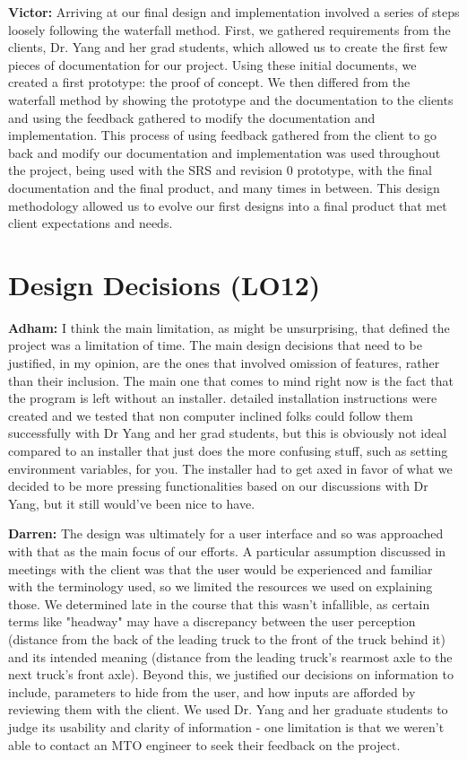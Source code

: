 \documentclass{article}
\begin{document}
\textbf{Victor:} Arriving at our final design and implementation involved a series of steps loosely following the waterfall method. First, we gathered requirements from the 
clients, Dr. Yang and her grad students, which allowed us to create the first few pieces of documentation for our project. Using these initial documents, we created a first 
prototype: the proof of concept. We then differed from the waterfall method by showing the prototype and the documentation to the clients and using the feedback gathered to 
modify the documentation and implementation. This process of using feedback gathered from the client to go back and modify our documentation and implementation was used 
throughout the project, being used with the SRS and revision 0 prototype, with the final documentation and the final product, and many times in between. This design methodology 
allowed us to evolve our first designs into a final product that met client expectations and needs.

\section{Design Decisions (LO12)}


\textbf{Adham:} I think the main limitation, as might be unsurprising, that defined the project was a limitation of time. The main design decisions that need to be justified, in
my opinion, are the ones that involved omission of features, rather than their inclusion. The main one that comes to mind right now is the fact that the program is left without
an installer. detailed installation instructions were created and we tested that non computer inclined folks could follow them successfully with Dr Yang and her grad students,
but this is obviously not ideal compared to an installer that just does the more confusing stuff, such as setting environment variables, for you. The installer had to get axed
in favor of what we decided to be more pressing functionalities based on our discussions with Dr Yang, but it still would've been nice to have.

\textbf{Darren:} The design was ultimately for a user interface and so was approached with that as the main focus of our efforts. A particular assumption discussed in meetings with the client was that the user would be experienced and familiar with the terminology used, so we limited the resources we used on explaining those. We determined late in the course that this wasn't infallible, as certain terms like "headway" may have a discrepancy between the user perception (distance from the back of the leading truck to the front of the truck behind it) and its intended meaning (distance from the leading truck's rearmost axle to the next truck's front axle). Beyond this, we justified our decisions on information to include, parameters to hide from the user, and how inputs are afforded by reviewing them with the client. We used Dr. Yang and her graduate students to judge its usability and clarity of information - one limitation is that we weren't able to contact an MTO engineer to seek their feedback on the project.
\end{document}
